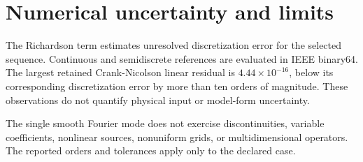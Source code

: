 \documentclass[11pt]{article}
\begin{document}
\section{Numerical uncertainty and limits}

The Richardson term estimates unresolved discretization error for the selected
sequence. Continuous and semidiscrete references are evaluated in IEEE binary64.
The largest retained Crank-Nicolson linear residual is
\(4.44\times10^{-16}\), below its corresponding discretization error by more
than ten orders of magnitude. These observations do not quantify physical
input or model-form uncertainty.

The single smooth Fourier mode does not exercise discontinuities, variable
coefficients, nonlinear sources, nonuniform grids, or multidimensional
operators. The reported orders and tolerances apply only to the declared case.
\end{document}
